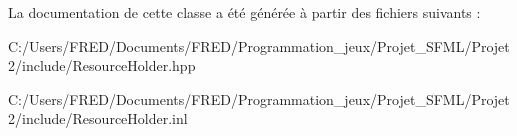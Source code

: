 La documentation de cette classe a été générée à partir des fichiers suivants \+:\begin{DoxyCompactItemize}
\item 
C\+:/\+Users/\+F\+R\+E\+D/\+Documents/\+F\+R\+E\+D/\+Programmation\+\_\+jeux/\+Projet\+\_\+\+S\+F\+M\+L/\+Projet2/include/Resource\+Holder.\+hpp\item 
C\+:/\+Users/\+F\+R\+E\+D/\+Documents/\+F\+R\+E\+D/\+Programmation\+\_\+jeux/\+Projet\+\_\+\+S\+F\+M\+L/\+Projet2/include/Resource\+Holder.\+inl\end{DoxyCompactItemize}
